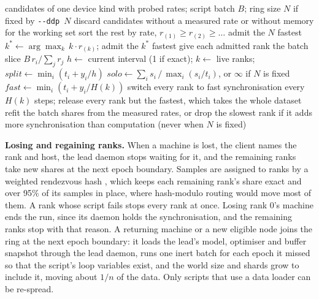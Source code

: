 \begin{algorithm}[!htbp]
\caption{Admitting a training ring and choosing its synchronisation}
\label{alg:ring}
\small
\begin{algorithmic}[1]
\Require candidates of one device kind with probed rates; script batch $B$; ring size $N$ if fixed by \texttt{-{}-ddp~$N$}
\State discard candidates without a measured rate or without memory for the working set
\State sort the rest by rate, $r_{(1)} \ge r_{(2)} \ge \dots$
  \State admit the $N$ fastest
\Else
  \State $k^{*} \gets \arg\max_k\, k \cdot r_{(k)}$; admit the $k^{*}$ fastest 
\EndIf
\State give each admitted rank the batch slice $B\, r_i / \sum_j r_j$
\Statex {}
\State $h \gets$ current interval (1 if exact); $k \gets$ live ranks; $\mathit{split} \gets \min_i (t_i + y_i/h)$
\State $\mathit{solo} \gets \sum_i s_i \,/\, \max_i (s_i/t_i)$, or $\infty$ if $N$ is fixed
  \State $\mathit{fast} \gets \min_i (t_i + y_i/H(k))$ 
    \State switch every rank to fast synchronisation every $H(k)$ steps; \Return
  \EndIf
\EndIf
{}
  \State release every rank but the fastest, which takes the whole dataset
\Else
  \State refit the batch shares from the measured rates, or drop the slowest rank if it adds more synchronisation than computation (never when $N$ is fixed)
\EndIf
\end{algorithmic}
\end{algorithm}

\textbf{Losing and regaining ranks.} When a machine is lost, the client names the
rank and host, the lead daemon stops waiting for it, and the remaining ranks take
new shares at the next epoch boundary. Samples are assigned to ranks by a weighted
rendezvous hash \cite{thaler1998rendezvous}, which keeps each remaining rank's share
exact and over 95\% of its samples in place, where hash-modulo routing would move
most of them. A rank whose script fails stops every rank at once. Losing rank 0's
machine ends the run, since its daemon holds the synchronisation, and the
remaining ranks stop with that reason. A returning machine or a
new eligible node joins the ring at the next epoch boundary: it loads the lead's
model, optimiser and buffer snapshot through the lead daemon, runs one inert
batch for each epoch it missed so that the script's loop variables exist, and the
world size and shards grow to include it, moving about $1/n$ of the data. Only
scripts that use a data loader can be re-spread.

